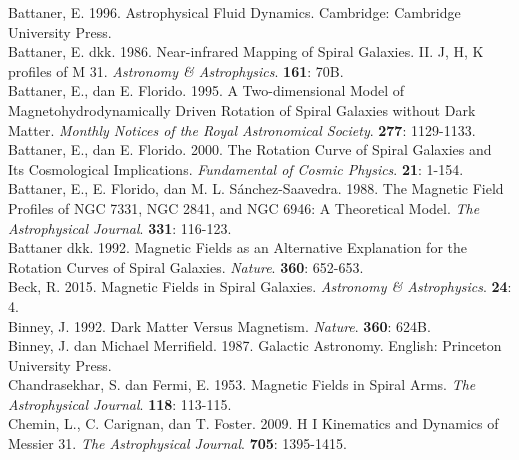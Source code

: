 \cleardoublepage
{}
{}
\begin{thebibliography}{}
\vspace{1.0cm}

\bibitem{}
Battaner, E. 1996. Astrophysical Fluid Dynamics. Cambridge: Cambridge University Press.\\

\bibitem{}  
Battaner, E. dkk. 1986. Near-infrared Mapping of Spiral Galaxies. II. J, H, K profiles of M 31. \textit{Astronomy & Astrophysics}. \textbf{161}: 70B. \\

\bibitem{}
Battaner, E., dan E. Florido. 1995. A Two-dimensional Model of Magnetohydrodynamically Driven Rotation of Spiral Galaxies without Dark Matter. \textit{Monthly Notices of the Royal Astronomical Society}. \textbf{277}: 1129-1133.\\

\bibitem{}
Battaner, E., dan E. Florido. 2000. The Rotation Curve of Spiral Galaxies and Its Cosmological Implications. \textit{Fundamental of Cosmic Physics}. \textbf{21}: 1-154. \\

\bibitem{}
Battaner, E., E. Florido, dan M. L. Sánchez-Saavedra. 1988. The Magnetic Field Profiles of NGC 7331, NGC 2841, and NGC 6946: A Theoretical Model. \textit{The Astrophysical Journal}. \textbf{331}: 116-123. \\

\bibitem{}
Battaner dkk. 1992. Magnetic Fields as an Alternative Explanation for the Rotation Curves of Spiral Galaxies. \textit{Nature}. \textbf{360}: 652-653.\\

\bibitem{}
Beck, R. 2015. Magnetic  Fields  in Spiral Galaxies. \textit{Astronomy & Astrophysics}. \textbf{24}: 4.\\

Binney, J. 1992. Dark Matter Versus Magnetism. \textit{Nature}. \textbf{360}: 624B.\\

Binney, J. dan Michael Merrifield. 1987. Galactic Astronomy. English: Princeton University Press. \\

Chandrasekhar, S. dan Fermi, E. 1953. Magnetic Fields in Spiral Arms. \textit{The Astrophysical Journal}. \textbf{118}: 113-115.\\

Chemin,  L., C. Carignan,  dan T. Foster. 2009. H I  Kinematics  and Dynamics of Messier 31. \textit{The Astrophysical Journal}. \textbf{705}: 1395-1415.\\


\end{thebibliography}
